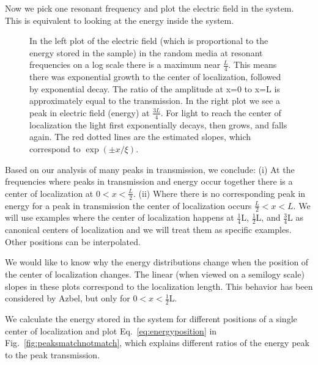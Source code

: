 Now we pick one resonant frequency and plot the electric field in the system. This is equivalent to looking at the energy inside the system. 
\begin{figure}
\vskip -0.5cm
\centerline{
}
\vskip -0.5cm
\caption[In the left plot of the electric field (which is proportional to the energy stored in the sample) in the random media at resonant frequencies on a log scale there is a maximum near $ \frac{L}{4}$.]{In the left plot of the electric field (which is proportional to the energy stored in the sample) in the random media at resonant frequencies on a log scale there is a maximum near $ \frac{L}{4}$. This means there was exponential growth to the  center of localization, followed by exponential decay. The ratio of the amplitude at x=0 to x=L is approximately equal to the transmission. In the right plot we see a peak in electric field (energy) at $ \frac{3L}{4} $. For light to reach the center of localization  the light first exponentially decays, then grows, and falls again. The red dotted lines are the estimated slopes, which correspond to $\exp(\pm x/\xi)$.} 
\label{fig:onequarterthreequarterelecfield}
\end{figure}

Based on our analysis of many peaks in transmission, we conclude:
(i) At the frequencies where peaks in transmission 
and energy occur together there is a center of localization at $ 0 < x < \frac{L}{2}$. 
(ii) Where there is no corresponding peak in energy 
for a peak in transmission the center of localization occurs $ \frac{L}{2}<x<L $. 
We will use examples where the center of localization
happens at $ \frac{1}{4} $L, $ \frac{1}{2} $L, 
and $ \frac{3}{4} $L as canonical centers of localization
and we will treat them as specific examples.  Other 
positions can be interpolated.

We would like to know why the energy distributions 
change when the position of the center of localization changes.
The linear (when viewed on a semilogy scale) slopes
in these plots correspond to the localization length.
This behavior has been considered by Azbel, but only for $ 0 < x < \frac{1}{2} $L.~\cite{1983_Azbel_zeroTemp}

We calculate the energy stored in the system for 
different positions of a single center of localization
and plot Eq.~\ref{eq:energyposition} in 	%
Fig.~\ref{fig:peaksmatchnotmatch}, which explains
different ratios of the energy peak to the peak transmission.


